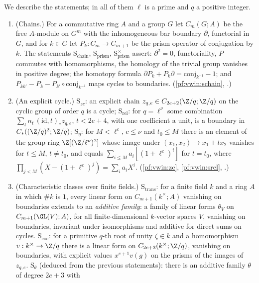 We describe the statements; in all of them $\ell$ is a prime and $q$ a positive integer.
\begin{enumerate}[label=(K\arabic*)]
\item\label{pf:vwin:K1} (Chains.) For a commutative ring $A$ and a group $G$ let $C_m(G;A)$ be the free $A$-module on $G^m$ with the
inhomogeneous bar boundary $\partial$, functorial in $G$, and for $k\in G$ let $P_k:C_m\to C_{m+1}$ be the prism operator of conjugation by $k$.
The statements $\mathrm{S}_{\mathrm{chain}}$, $\mathrm{S}_{\mathrm{prism}}$, $\mathrm{S}_{\mathrm{prism}}^{\times}$ assert: $\partial^2=0$,
functoriality, $P$ commutes with homomorphisms, the homology of the trivial group vanishes in positive degree; the homotopy formula
$\partial P_k+P_k\partial=\mathrm{conj}_{k^{-1}}-1$; and $P_{kk'}-P_k-P_{k'}\circ\mathrm{conj}_{k^{-1}}$ maps cycles to boundaries.
(\cref{pf:vwin:schain}, .)
\item\label{pf:vwin:K2} (An explicit cycle.) $\mathrm{S}_{zc}$: an explicit chain $z_{q,e}\in C_{2e+2}(\Z/q;\Z/q)$ on the cyclic group of order $q$ is a
cycle; $\mathrm{S}_{\mathrm{rel}}$: for $q=\ell^\nu$ some combination $\sum_tn_t\,(\mathrm{id},t)_*z_{q,e}$, $t<2e+4$, with one coefficient a unit, is a
boundary in $C_\ast((\Z/q)^2;\Z/q)$; $\mathrm{S}_\eta$: for $M<\ell^c$, $c\le\nu$ and $t_0\le M$ there is an element of the group ring
$\Z[(\Z/\ell^\nu)^2]$ whose image under $(x_1,x_2)\mapsto x_1+tx_2$ vanishes for $t\le M$, $t\ne t_0$, and equals
$\sum_{i\le M}a_i[(1+\ell^c)^i]$ for $t=t_0$, where $\prod_{j<M}(X-(1+\ell^c)^j)=\sum_ia_iX^i$. (\cref{pf:vwin:zc},
\cref{pf:vwin:srel}, .)
\item\label{pf:vwin:K3} (Characteristic classes over finite fields.) $\mathrm{S}_{\mathrm{trans}}$: for a finite field $k$ and a ring $A$ in which
$\#k$ is $1$, every linear form on $C_{m+1}(k^\times;A)$ vanishing on boundaries extends to an \emph{additive family}: a family of linear forms
$\theta_V$ on $C_{m+1}(\GL(V);A)$, for all finite-dimensional $k$-vector spaces $V$, vanishing on boundaries, invariant under isomorphisms and
additive for direct sums on cycles. $\mathrm{S}_{\mathrm{coc}}$: for a primitive $q$-th root of unity $\zeta\in k$ and a homomorphism $v:k^\times\to\Z/q$
there is a linear form on $C_{2e+3}(k^\times;\Z/q)$, vanishing on boundaries, with explicit values $x^{e+1}v(g)$ on the prisms of the images of
$z_{q,e}$. $\mathrm{S}_\theta$ (deduced from the previous statements): there is an additive family $\theta$ of degree $2e+3$ with

\end{enumerate}
